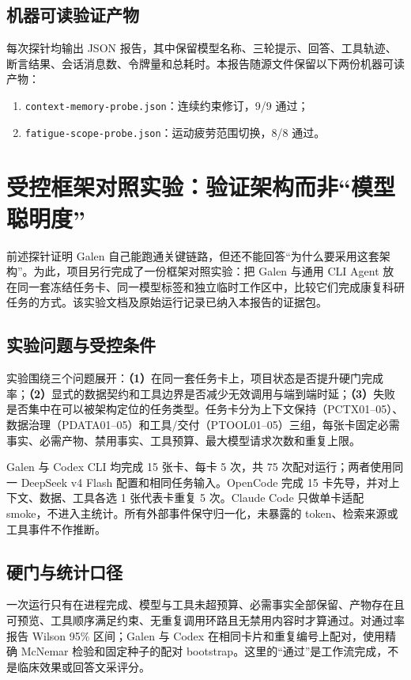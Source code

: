 \documentclass[11pt,a4paper]{article}
\begin{document}
\subsection{机器可读验证产物}
每次探针均输出 JSON 报告，其中保留模型名称、三轮提示、回答、工具轨迹、断言结果、会话消息数、令牌量和总耗时。本报告随源文件保留以下两份机器可读产物：
\begin{enumerate}[leftmargin=2em,itemsep=2pt]
\item \texttt{context-memory-probe.json}：连续约束修订，9/9 通过；
\item \texttt{fatigue-scope-probe.json}：运动疲劳范围切换，8/8 通过。
\end{enumerate}

\section{受控框架对照实验：验证架构而非“模型聪明度”}
前述探针证明 Galen 自己能跑通关键链路，但还不能回答“为什么要采用这套架构”。为此，项目另行完成了一份框架对照实验：把 Galen 与通用 CLI Agent 放在同一套冻结任务卡、同一模型标签和独立临时工作区中，比较它们完成康复科研任务的方式。该实验文档及原始运行记录已纳入本报告的证据包。

\subsection{实验问题与受控条件}
实验围绕三个问题展开：\textbf{（1）}在同一套任务卡上，项目状态是否提升硬门完成率；\textbf{（2）}显式的数据契约和工具边界是否减少无效调用与端到端时延；\textbf{（3）}失败是否集中在可以被架构定位的任务类型。任务卡分为上下文保持（PCTX01--05）、数据治理（PDATA01--05）和工具/交付（PTOOL01--05）三组，每张卡固定必需事实、必需产物、禁用事实、工具预算、最大模型请求次数和重复上限。

Galen 与 Codex CLI 均完成 15 张卡、每卡 5 次，共 75 次配对运行；两者使用同一 DeepSeek v4 Flash 配置和相同任务输入。OpenCode 完成 15 卡先导，并对上下文、数据、工具各选 1 张代表卡重复 5 次。Claude Code 只做单卡适配 smoke，不进入主统计。所有外部事件保守归一化，未暴露的 token、检索来源或工具事件不作推断。

\subsection{硬门与统计口径}
一次运行只有在进程完成、模型与工具未超预算、必需事实全部保留、产物存在且可预览、工具顺序满足约束、无重复调用环路且无禁用内容时才算通过。对通过率报告 Wilson 95\% 区间；Galen 与 Codex 在相同卡片和重复编号上配对，使用精确 McNemar 检验和固定种子的配对 bootstrap。这里的“通过”是工作流完成，不是临床效果或回答文采评分。
\end{document}
